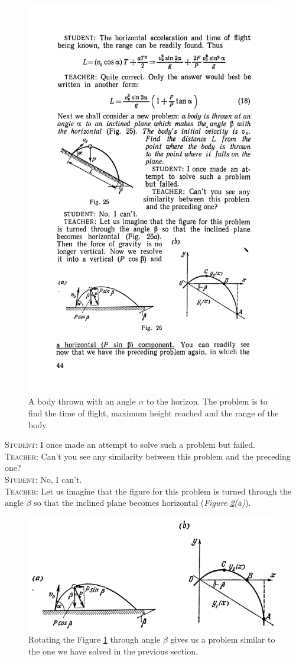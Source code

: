 \documentclass[a4paper,sfsidenotes]{tufte-book}
\begin{document}
\begin{figure}
\centering
\includegraphics[width=0.6\linewidth]{fig-025a.pdf}
\caption{A body thrown with an angle $\alpha$ to the horizon. The problem is to find the time of flight, maximum height reached and the range of the body.}
\label{fig-25}
\end{figure}
\textsc{Student:} I once made an attempt to solve such a problem but failed.
\\
\textsc{Teacher:} Can't you see any similarity between this problem and the preceding one?
\\
\textsc{Student:} No, I can't.
\\
\textsc{Teacher:} Let us imagine that the figure for this problem
is turned through the angle $\beta$ so that the inclined plane becomes horizontal (\emph{Figure \ref{fig-26}(a)}).

\begin{figure}
\centering
\includegraphics[width=0.8\linewidth]{fig-026a.pdf}
\caption{Rotating the Figure \ref{fig-25} through angle $\beta$ gives us a problem similar to the one we have solved in the previous section. }
\label{fig-26}
\end{figure}
\end{document}
